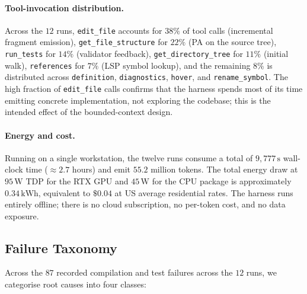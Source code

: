 \paragraph{Tool-invocation distribution.} Across the $12$ runs,
\texttt{edit\_file} accounts for $38\%$ of tool calls (incremental
fragment emission), \texttt{get\_file\_structure} for $22\%$ (PA on
the source tree), \texttt{run\_tests} for $14\%$ (validator
feedback), \texttt{get\_directory\_tree} for $11\%$ (initial walk),
\texttt{references} for $7\%$ (LSP symbol lookup), and the remaining
$8\%$ is distributed across \texttt{definition}, \texttt{diagnostics},
\texttt{hover}, and \texttt{rename\_symbol}. The high fraction of
\texttt{edit\_file} calls confirms that the harness spends most of
its time emitting concrete implementation, not exploring the codebase;
this is the intended effect of the bounded-context design.

\paragraph{Energy and cost.} Running on a single workstation, the
twelve runs consume a total of $9{,}777\,\text{s}$ wall-clock time
($\approx 2.7$ hours) and emit $55.2$ million tokens. The total energy
draw at $95\,\text{W}$ TDP for the RTX GPU and $45\,\text{W}$ for the
CPU package is approximately $0.34\,\text{kWh}$, equivalent to
$\$0.04$ at US average residential rates. The harness runs entirely
offline; there is no cloud subscription, no per-token cost, and no
data exposure.

\subsection{Failure Taxonomy}
\label{sec:eval_failures}

Across the $87$ recorded compilation and test failures across the
$12$ runs, we categorise root causes into four classes:

